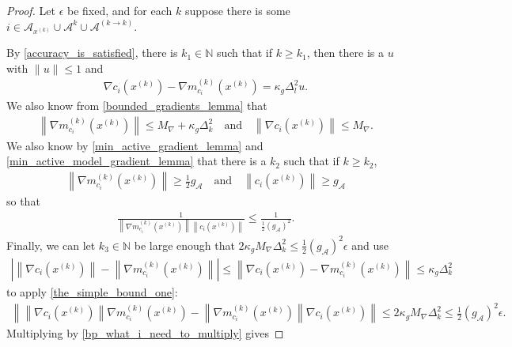 \documentclass{article}
\theoremstyle{case}
\numberwithin{theorem}{subsection}
\newcommand{\dk}{\Delta_k}
\newcommand{\gmcik}{{\nabla m_{c_i}^{(k)}\left(\xk\right)}}
\newcommand{\maxgrad}{{M_{\nabla}}}
\newcommand{\minactivegrad}{{ g_{\mathcal A} }}
\newcommand{\naturals}{\mathbb N}
\newcommand{\xk}{{x^{(k)}}}
\begin{document}
\begin{proof}
Let $\epsilon$ be fixed, and for each $k$ suppose there is some $i \in \mathcal A_{\xk} \cup \mathcal A^{k} \cup \mathcal A^{(k \to k)} $.

By \cref{accuracy_is_satisfied}, there is $k_1 \in \naturals$ such that if $k \ge k_1$, then there is a $u$ with $\|u\| \le 1$ and
\begin{align*}
\nabla c_i\left( \xk \right) - \gmcik = \kappa_g \Delta_{l}^2 u.
\end{align*}
We also know from \cref{bounded_gradients_lemma} that
\begin{align*}
\left\|\gmcik\right\| \le \maxgrad + \kappa_g \dk^2 \quad \textrm{and} \quad \left\|\nabla c_i(\xk) \right\| \le \maxgrad.
\end{align*}
We also know by \cref{min_active_gradient_lemma} and \cref{min_active_model_gradient_lemma} that there is a $k_2$ such that if $k \ge k_2$,
\begin{align*}
\left\|\gmcik \right\| \ge \frac 1 2 \minactivegrad \quad \textrm{and} \quad \left\|c_i\left(\xk\right)\right\| \ge \minactivegrad
\end{align*}
so that
\begin{align}
\frac {1} {\left\|\gmcik \right\|  \left\|c_i\left(\xk\right)\right\|  } \le \frac 1 {\frac 1 2 \left(\minactivegrad\right)^2}. \label{bp_what_i_need_to_multiply}
\end{align}
Finally, we can let $k_3 \in \naturals$ be large enough that $2 \kappa_g\maxgrad \dk^2 \le \frac 1 2 \left(\minactivegrad\right)^2\epsilon$ and use
\begin{align}
\left|\left\|\nabla c_i\left(\xk \right)\right\|  - \left\|\gmcik\right\|\right| \le \left\|\nabla c_i\left( \xk \right) - \gmcik\right\| \le \kappa_g \dk^2 \label{bp_asdfasdffdsafdsa}
\end{align}
to apply \cref{the_simple_bound_one}: 
\begin{align*}
\left\|\left\|\nabla c_i\left(\xk \right)\right\| {\gmcik} - \left\|\gmcik\right\|\nabla c_i\left(\xk\right)\right\|
\le 2 \kappa_g\maxgrad \dk^2 \le \frac 1 2 \left(\minactivegrad\right)^2\epsilon.
\end{align*}
Multiplying by \cref{bp_what_i_need_to_multiply} gives

\end{proof}
\end{document}
